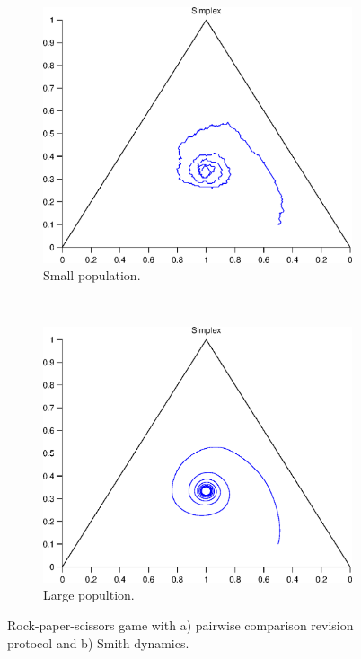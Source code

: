 \documentclass[a4paper,10pt]{article}
\begin{document}
\begin{figure}[tbh]
  \centering
  \begin{subfigure}[b]{0.4\textwidth}
	  \includegraphics[width=\textwidth]{./images/test_finite_pairwise_comparison.eps}
	  \caption{Small population.}
	  \label{fig:finite3_protocol}
  \end{subfigure}
  ~ 
  \begin{subfigure}[b]{0.4\textwidth}
	  \includegraphics[width=\textwidth]{./images/test1_simplex_smith.eps}
	  \caption{Large popultion.}
	  \label{fig:finite3_dynamics}
  \end{subfigure}
  \caption{Rock-paper-scissors game with a) pairwise comparison revision protocol and b) Smith dynamics.}
  \label{fig:finite3}
\end{figure}
\end{document}
